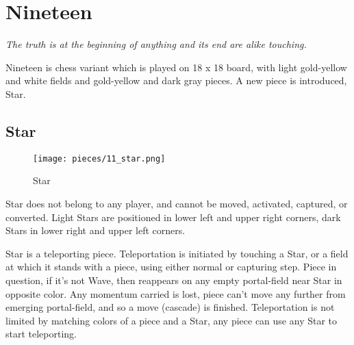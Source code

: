

\chapter*{Nineteen}
\label{ch:Nineteen}

\begin{flushright}
\parbox{0.8\textwidth}{
\emph{The truth is at the beginning of anything and its end are alike touching.\newline
{} } }
\end{flushright}

\noindent
Nineteen is chess variant which is played on 18 x 18 board, with light
gold-yellow and white fields and gold-yellow and dark gray pieces.
A new piece is introduced, Star.

\clearpage %

\section*{Star}
\label{sec:Nineteen/Star}

\vspace*{-1.0\baselineskip}
\noindent
\begin{wrapfigure}[11]{l}{0.4\textwidth}
\centering
\texttt{[image: pieces/11\_star.png]}
\caption{Star}
\label{fig:11_star}
\end{wrapfigure}
Star does not belong to any player, and cannot be moved, activated, captured, or
converted. Light Stars are positioned in lower left and upper right corners, dark
Stars in lower right and upper left corners.

Star is a teleporting piece. Teleportation is initiated by touching a Star, or a
field at which it stands with a piece, using either normal or capturing step. Piece
in question, if it's not Wave, then reappears on any empty portal-field near Star
in opposite color. Any momentum carried is lost, piece can't move any further from
emerging portal-field, and so a move (cascade) is finished. Teleportation is not
limited by matching colors of a piece and a Star, any piece can use any Star to
start teleporting.

